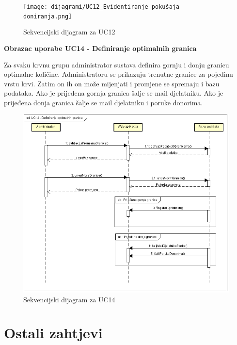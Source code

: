 \begin{figure}[H]
	\centering
	\texttt{[image: dijagrami/UC12\_Evidentiranje pokušaja doniranja.png]}
	\caption{Sekvencijski dijagram za UC12}
\end{figure}
\eject

\textbf{Obrazac uporabe UC14 - Definiranje optimalnih granica}

Za svaku krvnu grupu administrator sustava definira gornju i donju granicu optimalne količine. Administratoru se prikazuju trenutne granice za pojedinu vrstu krvi. Zatim on ih on može mijenjati i promjene se spremaju i bazu podataka. Ako je prijeđena gornja granica šalje se mail djelatniku. Ako je prijeđena donja granica šalje se mail djelatniku i poruke donorima.

\begin{figure}[H]
	\centering
	\includegraphics[width=\textwidth]{dijagrami/UC14_Definiranje optimalnih granica.png}
	\caption{Sekvencijski dijagram za UC14}
\end{figure}
\eject

\section{Ostali zahtjevi}

